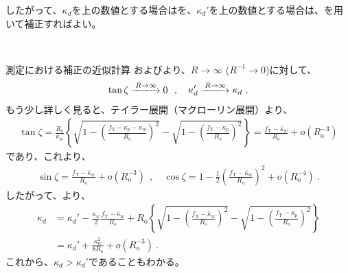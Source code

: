 したがって、$\kappa_d$を\Drawing 上の数値とする場合はを、$\kappa_d'$を\Drawing 上の数値とする場合は、を用いて補正すればよい。

\clearpage
~\vfill
\begin{\Columnname}{測定における\KeywayDepth 補正の近似計算}
およびより、$R\to\infty$ ($R^{-1}\to0$)に対して、
\begin{align*}
  \tan\zeta \xlongrightarrow{R\to\infty} 0~~, \quad
  \kappa_d' \xlongrightarrow{R\to\infty} \kappa_d\ .
\end{align*}
もう少し詳しく見ると、テイラー展開（マクローリン展開）より、
\begin{align*}
  \tan\zeta
  = \frac{R_\mathrm o}{\kappa_w}
     \left\{
     \sqrt{1-\left(\frac{f_\mathrm T-\kappa_p-\kappa_w}{R_\mathrm o}\right)^2}
     -\sqrt{1-\left(\frac{f_\mathrm T-\kappa_p}{R_\mathrm o}\right)^2}
     \right\}
  = \frac{f_\mathrm T-\bar\kappa_w}{R_\mathrm o}+o\left(R_\mathrm o^{-3}\right)
\end{align*}
であり、これより、
\begin{align*}
  \sin\zeta = \frac{f_\mathrm T-\bar\kappa_w}{R_\mathrm o}+o\left(R_\mathrm o^{-3}\right)~~, \quad
  \cos\zeta = 1-\frac12\left(\frac{f_\mathrm T-\bar\kappa_w}{R_\mathrm o}\right)^2
              +o\left(R_\mathrm o^{-4}\right)\ .
\end{align*}
したがって、より、
\begin{align*}
  \kappa_d
  &= \kappa_d'-\frac{\kappa_w}2\frac{f_\mathrm T-\bar\kappa_w}{R_\mathrm o}
     +R_\mathrm o
      \left\{
      \sqrt{1-\left(\frac{f_\mathrm T-\bar\kappa_w}{R_\mathrm o}\right)^2}
      -\sqrt{1-\left(\frac{f_\mathrm T-\kappa_p}{R_\mathrm o}\right)^2}
      \right\}\\
  &= \kappa_d'+\frac{\kappa_w^2}{8R_\mathrm o}
     +o\left(R_\mathrm o^{-3}\right)\ .
\end{align*}
これから、$\kappa_d > \kappa_d'$であることもわかる。
\end{\Columnname}



